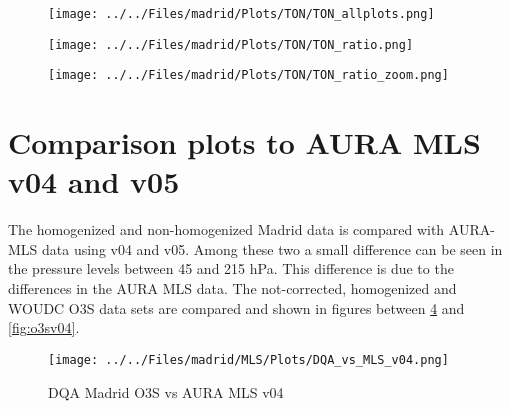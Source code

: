                                                 \begin{figure}
        \centering
\texttt{[image: ../../Files/madrid/Plots/TON/TON\_allplots.png]}
            \label{fig:ton1}
    \end{figure}

                                                \begin{figure}
        \centering
\texttt{[image: ../../Files/madrid/Plots/TON/TON\_ratio.png]}
            \label{fig:ton2}
    \end{figure}

                                                \begin{figure}
        \centering
\texttt{[image: ../../Files/madrid/Plots/TON/TON\_ratio\_zoom.png]}
            \label{fig:ton3}
    \end{figure}

\section{Comparison plots to AURA MLS v04 and v05}

    The homogenized and non-homogenized Madrid data is compared with AURA-MLS data using v04 and v05. Among these two a small difference
    can be seen in the pressure levels between 45 and 215 hPa. This difference is due to the differences in the AURA MLS data.
    The not-corrected, homogenized and WOUDC O3S data sets are compared and shown in figures between
\ref{fig:rawv04} and \ref{fig:o3sv04}.

                            \begin{figure}
        \centering
\texttt{[image: ../../Files/madrid/MLS/Plots/DQA\_vs\_MLS\_v04.png]}
    \caption{DQA Madrid O3S vs AURA MLS v04 }
            \label{fig:rawv04}
    \end{figure}


